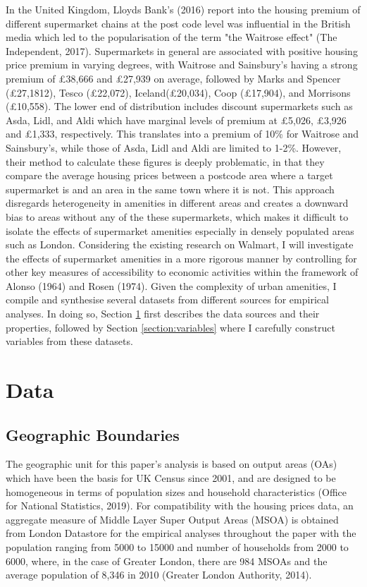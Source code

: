 \documentclass{article}
\begin{document}
In the United Kingdom, Lloyds Bank's (2016) report into the housing premium of different supermarket chains at the post code level was influential in the British media which led to the popularisation of the term "the Waitrose effect" (The Independent, 2017). Supermarkets in general are associated with positive housing price premium in varying degrees, with Waitrose and Sainsbury's having a strong premium of £38,666 and £27,939 on average, followed by Marks and Spencer (£27,1812), Tesco (£22,072), Iceland(£20,034), Coop (£17,904), and Morrisons (£10,558). The lower end of distribution includes discount supermarkets such as Asda, Lidl, and Aldi which have marginal levels of premium at £5,026, £3,926 and £1,333, respectively. This translates into a premium of 10\% for Waitrose and Sainsbury's, while those of Asda, Lidl and Aldi are limited to 1-2\%. However, their method to calculate these figures is deeply problematic, in that they compare the average housing prices between a postcode area where a target supermarket is and an area in the same town where it is not. This approach disregards heterogeneity in amenities in different areas and creates a downward bias to areas without any of the these supermarkets, which makes it difficult to isolate the effects of supermarket amenities especially in densely populated areas such as London. Considering the existing research on Walmart, I will investigate the effects of supermarket amenities in a more rigorous manner by controlling for other key measures of accessibility to economic activities within the framework of Alonso (1964) and Rosen (1974). Given the complexity of urban amenities, I compile and synthesise several datasets from different sources for empirical analyses. In doing so, Section \ref{section:data} first describes the data sources and their properties, followed by Section \ref{section:variables} where I carefully construct variables from these datasets.


\section{Data} \label{section:data}
\subsection{Geographic Boundaries}
The geographic unit for this paper's analysis is based on output areas (OAs) which have been the basis for UK Census since 2001, and are designed to be homogeneous in terms of population sizes and household characteristics (Office for National Statistics, 2019). For compatibility with the housing prices data, an aggregate measure of Middle Layer Super Output Areas (MSOA) is obtained from London Datastore for the empirical analyses throughout the paper with the population ranging from 5000 to 15000 and number of households from 2000 to 6000, where, in the case of Greater London, there are 984 MSOAs and the average population of 8,346 in 2010 (Greater London Authority, 2014).
\end{document}
